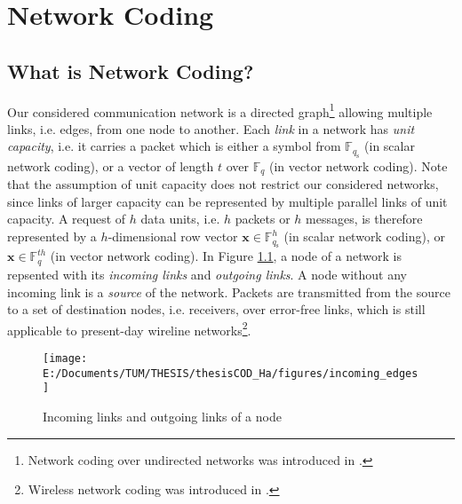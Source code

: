 \chapter{Network Coding} \label{chap:network_coding}

\section{What is Network Coding?}

Our considered communication network is a directed graph\footnote{Network coding over undirected networks was introduced in \cite{Li:2004}.}
allowing multiple links, i.e. edges, from one node to another. Each
\textit{link} in a network has \textit{unit capacity}, i.e. it carries
a packet which is either a symbol from $\ensuremath{\mathbb{F}}_{q_{\mathrm{s}}}$
(in scalar network coding), or a vector of length $t$ over $\ensuremath{\mathbb{F}}_{q}$
(in vector network coding). Note that the assumption of unit capacity
does not restrict our considered networks, since links of larger capacity
can be represented by multiple parallel links of unit capacity. A
request of $h$ data units, i.e. $h$ packets or $h$ messages, is
therefore represented by a $h$-dimensional row vector $\boldsymbol{x}\in\ensuremath{\mathbb{F}}_{q_{\mathrm{s}}}^{h}$
(in scalar network coding), or $\boldsymbol{x}\in\ensuremath{\mathbb{F}}_{q}^{th}$
(in vector network coding). In Figure \ref{fig:incoming_links}, a
node of a network is repsented with its \textit{incoming links} and
\textit{outgoing links}. A node without any incoming link is a \textit{source}
of the network. Packets are transmitted from the source to a set of
destination nodes, i.e. receivers, over error-free links, which is
still applicable to present-day wireline networks\footnote{Wireless network coding was introduced in \cite{Katti:2008}.}. 

\begin{figure}[H]
\caption{Incoming links and outgoing links of a node \label{fig:incoming_links}}

\centering{}\texttt{[image: E:/Documents/TUM/THESIS/thesisCOD\_Ha/figures/incoming\_edges]}
\end{figure}

